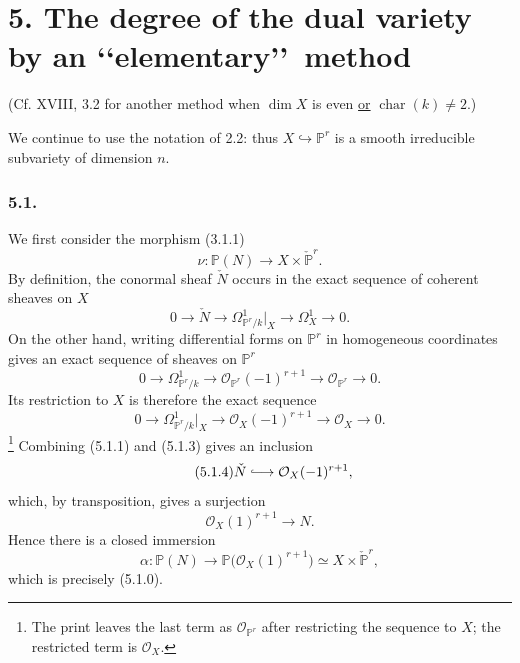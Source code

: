 \section*{5. The degree of the dual variety by an
\lq\lq elementary\rq\rq\ method}

(Cf. XVIII, 3.2 for another method when $\dim X$ is even
\underline{or} $\operatorname{char}(k)\ne2$.)

We continue to use the notation of 2.2: thus
$X\hookrightarrow\mathbb P^r$ is a smooth irreducible subvariety of
dimension $n$.

\subsubsection*{5.1.}
We first consider the morphism (3.1.1)
\begin{equation}\tag{5.1.0}
\nu:\mathbb P(N)\longrightarrow X\times\check{\mathbb P}^{r}.
\end{equation}
By definition, the conormal sheaf $\check N$ occurs in the exact
sequence of coherent sheaves on $X$
\begin{equation}\tag{5.1.1}
0\longrightarrow\check N
\longrightarrow\Omega^1_{\mathbb P^r/k}|_X
\longrightarrow\Omega^1_X
\longrightarrow0.
\end{equation}
On the other hand, writing differential forms on $\mathbb P^r$ in
homogeneous coordinates gives an exact sequence of sheaves on
$\mathbb P^r$
\begin{equation}\tag{5.1.2}
0\longrightarrow\Omega^1_{\mathbb P^r/k}
\longrightarrow\mathcal O_{\mathbb P^r}(-1)^{r+1}
\longrightarrow\mathcal O_{\mathbb P^r}
\longrightarrow0.
\end{equation}
Its restriction to $X$ is therefore the exact sequence
\begin{equation}\tag{5.1.3}
0\longrightarrow\Omega^1_{\mathbb P^r/k}|_X
\longrightarrow\mathcal O_X(-1)^{r+1}
\longrightarrow\mathcal O_X
\longrightarrow0.
\end{equation}
\footnote{The print leaves the last term as
$\mathcal O_{\mathbb P^r}$ after restricting the sequence to $X$;
the restricted term is $\mathcal O_X$.}
Combining (5.1.1) and (5.1.3) gives an inclusion
\begin{equation}\tag{5.1.4}
\check N\lhook\joinrel\longrightarrow\mathcal O_X(-1)^{r+1},
\end{equation}
which, by transposition, gives a surjection
\begin{equation}\tag{5.1.5}
\mathcal O_X(1)^{r+1}\longrightarrow N.
\end{equation}
Hence there is a closed immersion
\begin{equation}\tag{5.1.6}
\alpha:\mathbb P(N)
\longrightarrow\mathbb P\bigl(\mathcal O_X(1)^{r+1}\bigr)
\simeq X\times\check{\mathbb P}^{r},
\end{equation}
which is precisely (5.1.0).

